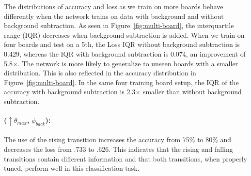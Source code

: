 The distributions of accuracy and loss as we train on more boards behave differently when the network trains on data with background and without background subtraction. As seen in Figure~\ref{fig:multi-board}, the interquartile range (IQR) decreases when background subtraction is added.
When we train on four boards and test on a 5th, the Loss IQR without background subtraction is 0.429, whereas the IQR  with background subtraction is 0.074, an improvement of 5.8$\times$. The network is more likely to generalize to unseen boards with a smaller distribution. This is also reflected in the accuracy distribution in Figure~\ref{fig:multi-board}. In the same four training board setup, the IQR of the accuracy with background subtraction is 2.3$\times$ smaller than without background subtraction.

\paragraph{($\uparrow\theta_{max}$, $\phi_{back}$): }
The use of the rising transition increases the accuracy from 75\% to 80\% and decreases the loss from .733 to .626. This indicates that the rising and falling transitions contain different information and that both transitions, when properly tuned, perform well in this classification task.

